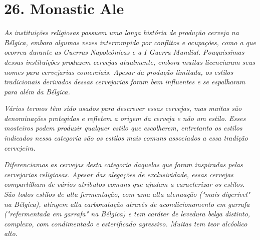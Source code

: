 \section*{26. Monastic Ale}
\textit{As instituições religiosas possuem uma longa história de produção cerveja na Bélgica, embora algumas vezes interrompida por conflitos e ocupações, como a que ocorreu durante as Guerras Napoleônicas e a I Guerra Mundial. Pouquíssimas dessas instituições produzem cervejas atualmente, embora muitas licenciaram seus nomes para cervejarias comerciais. Apesar da produção limitada, os estilos tradicionais derivados dessas cervejarias foram bem influentes e se espalharam para além da Bélgica.}

\textit{Vários termos têm sido usados para descrever essas cervejas, mas muitas são denominações protegidas e refletem a origem da cerveja e não um estilo. Esses mosteiros podem produzir qualquer estilo que escolherem, entretanto os estilos indicados nessa categoria são os estilos mais comuns associados a essa tradição cervejeira.}

\textit{Diferenciamos as cervejas desta categoria daquelas que foram inspiradas pelas cervejarias religiosas. Apesar das alegações de exclusividade, essas cervejas compartilham de vários atributos comuns que ajudam a caracterizar os estilos. São todos estilos de alta fermentação, com uma alta atenuação ("mais digerível" na Bélgica), atingem alta carbonatação através de acondicionamento em garrafa ("refermentada em garrafa" na Bélgica) e tem caráter de levedura belga distinto, complexo, com condimentado e esterificado agressivo. Muitas tem teor alcóolico alto.}